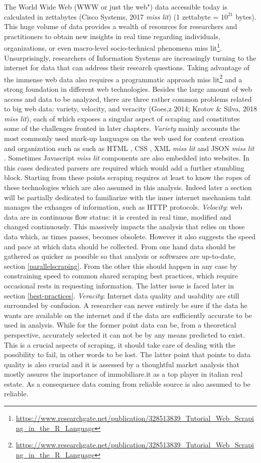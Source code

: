 \documentclass[
  12pt,
  a4paper,
  oneside]{book}
\DeclareRobustCommand{\href}[2]{#2\footnote{\url{#1}}}
\theoremstyle{definition}
\theoremstyle{definition}
\theoremstyle{definition}
\theoremstyle{remark}
\begin{document}
The World Wide Web (WWW or just the web") data accessible today is calculated in zettabytes (Cisco Systems, 2017 \emph{miss lit}) (1 zettabyte = \(10^{21}\) bytes). This huge volume of data provides a wealth of resources for researchers and practitioners to obtain new insights in real time regarding individuals, organizations, or even macro-level socio-technical phenomena \href{https://www.researchgate.net/publication/328513839_Tutorial_Web_Scraping_in_the_R_Language}{miss lit}. Unsurprisingly, researchers of Information Systems are increasingly turning to the internet for data that can address their research questions.
Taking advantage of the immense web data also requires a programmatic approach \href{https://www.researchgate.net/publication/328513839_Tutorial_Web_Scraping_in_the_R_Language}{miss lit} and a strong foundation in different web technologies.
Besides the large amount of web access and data to be analyzed, there are three rather common problems related to big web data: variety, velocity, and veracity (Goes,z 2014; Krotov \& Silva, 2018 \emph{miss lit}), each of which exposes a singular aspect of scraping and constitutes some of the challenges fronted in later chapters.
\emph{Variety} mainly accounts the most commonly used mark-up languages on the web used for content creation and organization such as such as HTML \citep{html_2020}, CSS \citep{css_2020}, XML \emph{miss lit} and JSON \emph{miss lit} . Sometimes Javascript \emph{miss lit} components are also embedded into websites. In this cases dedicated parsers are required which would add a further stumbling block. Starting from these points scraping requires at least to know the ropes of these technologies which are also assumed in this analysis. Indeed later a section will be partially dedicated to familiarize with the inner internet mechanism taht manages the exhanges of information, such as HTTP protocols.
\emph{Velocity}: web data are in continuous flow status: it is created in real time, modified and changed continuously. This massively impacts the analysis that relies on those data which, as times passes, becomes obsolete. However it also suggests the speed and pace at which data should be collected. From one hand data should be gathered as quicker as possible so that analysis or softwares are up-to-date, section \ref{parallelscraping}. From the other this should happen in any case by constraining speed to common shared scraping best practices, which require occasional rests in requesting information. The latter issue is faced later in section \ref{best-practices}.
\emph{Veracity}: Internet data quality and usability are still surrounded by confusion. A researcher can never entirely be sure if the data he wants are available on the internet and if the data are sufficiently accurate to be used in analysis. While for the former point data can be, from a theoretical perspective, accurately selected it can not be by any means predicted to exist. This is a crucial aspects of scraping, it should take care of dealing with the possibility to fail, in other words to be lost. The latter point that points to data quality is also crucial and it is assessed by a thoughtful market analysis that mostly assures the importance of immobiliare.it as a top player in italian real estate. As a consequence data coming from reliable source is also assumed to be reliable.
\end{document}
